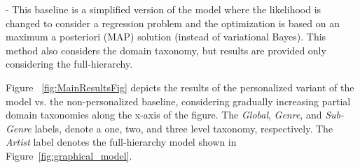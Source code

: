  - This baseline is a simplified version of the model where the likelihood is changed to consider a regression problem and the optimization is based on an maximum a posteriori (MAP) solution (instead of variational Bayes). This method also considers the domain taxonomy, but results are provided only considering the full-hierarchy. 






Figure ~\ref{fig:MainResultsFig} depicts the results of the personalized variant of the model vs. the non-personalized baseline, considering gradually increasing partial domain taxonomies along the x-axis of the figure. The \textit{Global}, \textit{Genre}, and \textit{Sub-Genre} labels, denote a one, two, and three level taxonomy, respectively. The \textit{Artist} label denotes the full-hierarchy model shown in Figure~\ref{fig:graphical_model}.


